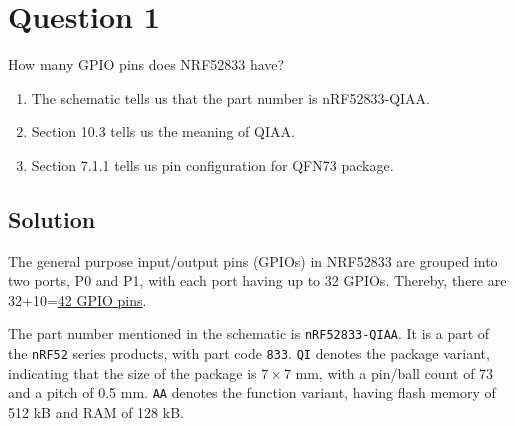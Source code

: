 \section*{Question 1}

How many GPIO pins does NRF52833 have?
\begin{enumerate}[label= (\alph*)]
    \item The schematic tells us that the part number is nRF52833-QIAA.\@
    \item Section 10.3 tells us the meaning of QIAA.\@
    \item Section 7.1.1 tells us pin configuration for QFN73 package.
\end{enumerate}

\subsection*{Solution}

The general purpose input/output pins (GPIOs) in NRF52833 are grouped into two ports, P0 and P1, with each port having up to 32 GPIOs.
Thereby, there are 32+10=\underline{42 GPIO pins}.

The part number mentioned in the schematic is \texttt{nRF52833-QIAA}.
It is a part of the \texttt{nRF52} series products, with part code \texttt{833}.
\texttt{QI} denotes the package variant, indicating that the size of the package is \( 7\times 7 \) mm, with a pin/ball count of 73 and a pitch of 0.5 mm.
\texttt{AA} denotes the function variant, having flash memory of 512 kB and RAM of 128 kB.\@
